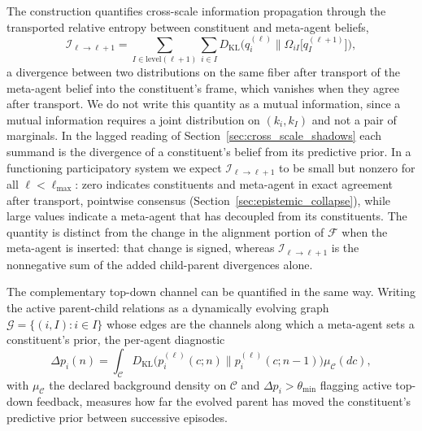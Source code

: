 \documentclass[11pt]{article}
\begin{document}
The construction quantifies cross-scale information propagation through the transported relative entropy between constituent and meta-agent beliefs,
\begin{equation}
\mathcal{I}_{\ell \to \ell+1} = \sum_{I \in \mathrm{level}(\ell+1)} \sum_{i \in I} D_{\mathrm{KL}}\big(q_i^{(\ell)} \big\| \Omega_{iI}\big[q_I^{(\ell+1)}\big]\big),
\label{eq:cross_scale_information_flow}
\end{equation}
a divergence between two distributions on the same fiber after transport of the meta-agent belief into the constituent's frame, which vanishes when they agree after transport. We do not write this quantity as a mutual information, since a mutual information requires a joint distribution on $(k_i, k_I)$ and not a pair of marginals. In the lagged reading of Section~\ref{sec:cross_scale_shadows} each summand is the divergence of a constituent's belief from its predictive prior. In a functioning participatory system we expect $\mathcal{I}_{\ell \to \ell+1}$ to be small but nonzero for all $\ell < \ell_{\max}$: zero indicates constituents and meta-agent in exact agreement after transport, pointwise consensus (Section~\ref{sec:epistemic_collapse}), while large values indicate a meta-agent that has decoupled from its constituents. The quantity is distinct from the change in the alignment portion of $\mathcal{F}$ when the meta-agent is inserted: that change is signed, whereas $\mathcal{I}_{\ell \to \ell+1}$ is the nonnegative sum of the added child-parent divergences alone.

The complementary top-down channel can be quantified in the same way. Writing the active parent-child relations as a dynamically evolving graph $\mathcal{G} = \{(i, I) : i \in I\}$ whose edges are the channels along which a meta-agent sets a constituent's prior, the per-agent diagnostic
\begin{equation}
\Delta p_i(n) = \int_{\mathcal{C}} D_{\mathrm{KL}}\big(p_i^{(\ell)}(c; n) \big\| p_i^{(\ell)}(c; n-1)\big) \mu_{\mathcal{C}}(dc),
\label{eq:topdown_influence}
\end{equation}
with $\mu_{\mathcal{C}}$ the declared background density on $\mathcal{C}$ and $\Delta p_i > \theta_{\min}$ flagging active top-down feedback, measures how far the evolved parent has moved the constituent's predictive prior between successive episodes.
\end{document}
